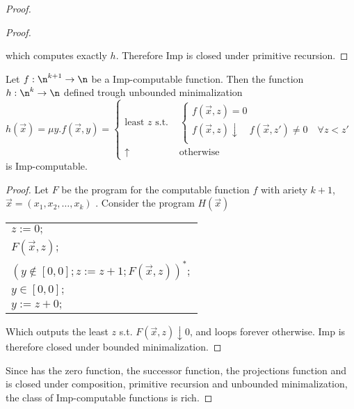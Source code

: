 \begin{proof}
\begin{proof}
\begin{center}
    \end{center}

    which computes exactly \(h\). Therefore Imp is closed under
    primitive recursion.
  \end{proof}

  \begin{lemma}
    Let \(f : \n^{k+1} \to \n\) be a Imp-computable function. Then the
    function \(h : \n^k \to \n\) defined trough unbounded
    minimalization
    \begin{equation}
      h(\vec{x}) = \mu y . f(\vec{x}, y) = \begin{cases}
        \text{least } z \text{ s.t. } & \begin{cases}
          f(\vec{x}, z) = 0 \\
	  f(\vec{x}, z) \downarrow \quad f(\vec{x},z')\neq 0 \quad \forall z < z' \\
	\end{cases} \\
        \uparrow                      & \text{otherwise}
      \end{cases}
    \end{equation}
    is Imp-computable.
  \end{lemma}

  \begin{proof}
    Let \(F\) be the program for the computable function \(f\)
    with ariety \(k+1\), \(\vec{x} = (x_1, x_2, \dots, x_k)\)
    . Consider the program \(H(\vec{x})\)
    \begin{center}
      \begin{tabular}{l}
        \(z := 0;\)\\[0pt]
        \(F(\vec{x},z);\)\\[0pt]
        \((y \not\in [0,0];z := z + 1;F(\vec{x},z))^*;\)\\[0pt]
        \(y\in [0,0];\)\\[0pt]
        \(y := z + 0;\)\\[0pt]
      \end{tabular}

    \end{center}
    Which outputs the least \(z\) s.t. \(F(\vec{x},z) \downarrow 0\),
    and loops forever otherwise. Imp is therefore closed under bounded
    minimalization.
  \end{proof}
  Since has the zero function, the successor function, the projections
  function and is closed under composition, primitive recursion and
  unbounded minimalization, the class of Imp-computable functions is
  rich.
\end{proof}

